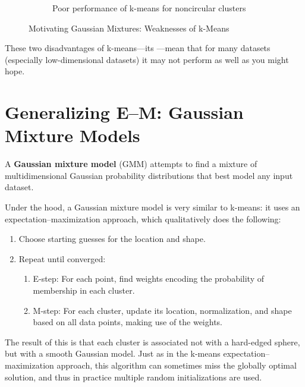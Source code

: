 \begin{figure}
\begin{subfigure}[f]{.45\textwidth}
        \caption{Poor performance of k-means for noncircular clusters}
    \end{subfigure}
    \caption{Motivating Gaussian Mixtures: Weaknesses of k-Means}
\end{figure}

These two disadvantages of k-means—its —mean that for many datasets (especially low-dimensional datasets) it may not perform as well as you might hope.

\section{Generalizing E–M: Gaussian Mixture Models}
A \textbf{Gaussian mixture model} (GMM) attempts to find a mixture of multidimensional
Gaussian probability distributions that best model any input dataset.

Under the hood, a Gaussian mixture model is very similar to k-means: it uses an
expectation–maximization approach, which qualitatively does the following:
\begin{enumerate}
    \item Choose starting guesses for the location and shape.
    \item Repeat until converged:
          \begin{enumerate}
              \item E-step: For each point, find weights encoding the probability of membership in each cluster.
              \item M-step: For each cluster, update its location, normalization, and shape based on all data points, making use of the weights.
          \end{enumerate}
\end{enumerate}
The result of this is that each cluster is associated not with a hard-edged sphere, but
with a smooth Gaussian model. Just as in the k-means expectation–maximization
approach, this algorithm can sometimes miss the globally optimal solution, and thus
in practice multiple random initializations are used.

